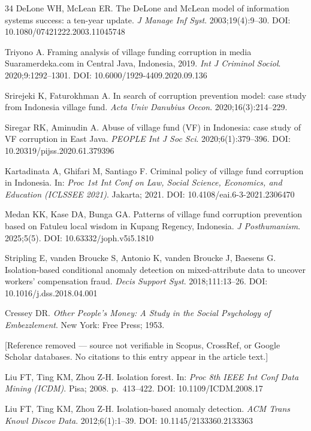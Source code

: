 \documentclass[3p,times,procedia]{elsarticle}
\begin{document}
\begin{thebibliography}{34}
DeLone WH, McLean ER. The DeLone and McLean model of information systems success: a ten-year update. \textit{J Manage Inf Syst}. 2003;19(4):9--30. DOI: 10.1080/07421222.2003.11045748

Triyono A. Framing analysis of village funding corruption in media Suaramerdeka.com in Central Java, Indonesia, 2019. \textit{Int J Criminol Sociol}. 2020;9:1292--1301. DOI: 10.6000/1929-4409.2020.09.136

Srirejeki K, Faturokhman A. In search of corruption prevention model: case study from Indonesia village fund. \textit{Acta Univ Danubius Oecon}. 2020;16(3):214--229.

Siregar RK, Aminudin A. Abuse of village fund (VF) in Indonesia: case study of VF corruption in East Java. \textit{PEOPLE Int J Soc Sci}. 2020;6(1):379--396. DOI: 10.20319/pijss.2020.61.379396

Kartadinata A, Ghifari M, Santiago F. Criminal policy of village fund corruption in Indonesia. In: \textit{Proc 1st Int Conf on Law, Social Science, Economics, and Education (ICLSSEE 2021)}. Jakarta; 2021. DOI: 10.4108/eai.6-3-2021.2306470

Medan KK, Kase DA, Bunga GA. Patterns of village fund corruption prevention based on Fatuleu local wisdom in Kupang Regency, Indonesia. \textit{J Posthumanism}. 2025;5(5). DOI: 10.63332/joph.v5i5.1810

Stripling E, vanden Broucke S, Antonio K, vanden Broucke J, Baesens G. Isolation-based conditional anomaly detection on mixed-attribute data to uncover workers' compensation fraud. \textit{Decis Support Syst}. 2018;111:13--26. DOI: 10.1016/j.dss.2018.04.001

Cressey DR. \textit{Other People's Money: A Study in the Social Psychology of Embezzlement}. New York: Free Press; 1953.

[Reference removed --- source not verifiable in Scopus, CrossRef, or Google Scholar databases. No citations to this entry appear in the article text.]

Liu FT, Ting KM, Zhou Z-H. Isolation forest. In: \textit{Proc 8th IEEE Int Conf Data Mining (ICDM)}. Pisa; 2008. p.\ 413--422. DOI: 10.1109/ICDM.2008.17

Liu FT, Ting KM, Zhou Z-H. Isolation-based anomaly detection. \textit{ACM Trans Knowl Discov Data}. 2012;6(1):1--39. DOI: 10.1145/2133360.2133363


\end{thebibliography}
\end{document}
